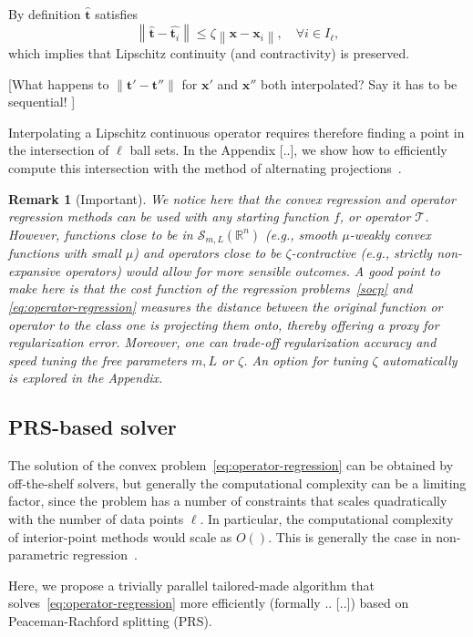 \documentclass{article}
\newtheorem{remark}[theorem]{Remark}
\newcommand{\norm}[1]{\left\lVert#1\right\rVert}
\newcommand{\R}{\mathbb{R}}
\newcommand{\tv}{\mathbold{t}}
\newcommand{\x}{\mathbold{x}}
\newcommand{\andrea}[1]{{\color{red}[#1]}}
\begin{document}
By definition $\hat{\tv}$ satisfies
\begin{equation}\label{eq:lipschitz-interpolation}
	\norm{\hat{\tv} - \hat{\tv_i}} \leq \zeta \norm{\x - \x_i}, \quad \forall i \in I_{\ell},
\end{equation}
which implies that Lipschitz continuity (and contractivity) is preserved.

\andrea{What happens to $\|\tv' - \tv''\|$ for $\x'$ and $\x''$ both interpolated? Say it has to be sequential! }

Interpolating a Lipschitz continuous operator requires therefore finding a point in the intersection of $\ell$ ball sets. In the Appendix [..], we show how to efficiently compute this intersection with the method of alternating projections~\cite{reich_projection_2015}.


\begin{remark}[Important] We notice here that the convex regression and operator regression methods can be used with any starting function $f$, or operator $\mathcal{T}$. However, functions close to be in $\mathcal{S}_{m,L}(\R^n)$ (e.g., smooth $\mu$-weakly convex functions with small $\mu$) and operators close to be $\zeta$-contractive (e.g., strictly non-expansive operators) would allow for more sensible outcomes. A good point to make here is that the cost function of the regression problems~\eqref{socp} and \eqref{eq:operator-regression} measures the distance between the original function or operator to the class one is projecting them onto, thereby offering a proxy for regularization error. Moreover, one can trade-off regularization accuracy and speed tuning the free parameters $m,L$ or $\zeta$. An option for tuning $\zeta$ automatically is explored in the Appendix.
\end{remark}


\subsection{PRS-based solver}

The solution of the convex problem~\eqref{eq:operator-regression} can be obtained by off-the-shelf solvers, but generally the computational complexity can be a limiting factor, since the problem has a number of constraints that scales quadratically with the number of data points $\ell$. In particular, the computational complexity of interior-point methods would scale as $O()$. This is generally the case in non-parametric regression~\cite{.}. 

Here, we propose a trivially parallel tailored-made algorithm that solves~\eqref{eq:operator-regression} more efficiently (formally .. [..]) based on Peaceman-Rachford splitting (PRS).   
\end{document}
